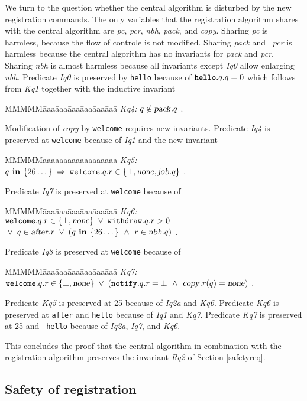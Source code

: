 \documentclass[10pt]{article} \usepackage[english]{babel}
\newenvironment{tab}{\begin{tabbing}
MMMMM\=aaa\=aaa\=aaa\=aaa\=aaa\=aaa\= \kill}{\end{tabbing}}
\def\S #1/{\mbox {\textsl{#1}}}
\def\B #1/{\mbox {\textbf{#1}}}
\def\T #1/{\mbox {\texttt{#1}}}
\def\Implies{\;\Rightarrow\;}
\def\Land   {\mbox{ $\;\land\;$ }}
\def\Lor    {\;\lor\;}
\begin{document}
We turn to the question whether the central algorithm is disturbed by
the new registration commands.  The only variables that the
registration algorithm shares with the central algorithm are \S pc/,
\S pcr/, \S nbh/, \S pack/, and \S copy/.  Sharing \S pc/ is harmless,
because the flow of controle is not modified.  Sharing \S pack/ and \S
pcr/ is harmless because the central algorithm has no invariants for
\S pack/ and \S pcr/.  Sharing \S nbh/ is almost harmless because all
invariants except \S Iq0/ allow enlarging \S nbh/.  Predicate \S Iq0/
is preserved by \T hello/ because of $\T hello/.q.q=0$ which follows
from \S Kq1/ together with the inductive invariant
\begin{tab}
  \S Kq4:/ \> $ q\notin \S pack/.q $ .
\end{tab}

Modification of \S copy/ by \T welcome/ requires new invariants.
Predicate \S Iq4/ is preserved at \T welcome/ because of \S Iq1/ and
the new invariant
\begin{tab}
\S Kq5:/ \> $ q\B\ in /\{26\dots\} \Implies 
\T welcome/.q.r \in \{ \bot, \S none/, \S job/.q \} $ .
\end{tab}
Predicate \S Iq7/ is preserved at \T welcome/ because of 
\begin{tab}
\S Kq6:/ \> $ \T welcome/.q.r \in \{ \bot, \S none/ \}
\Lor \T withdraw/.q.r > 0 $ \\
\> $ \Lor\: q\in\S after/.r
\Lor (q\B\ in /\{26\dots\} \Land r\in\S nbh/.q) $ .
\end{tab}
Predicate \S Iq8/ is preserved at \T welcome/ because of 
\begin{tab}
\S Kq7:/ \> $ \T welcome/.q.r \in \{ \bot, \S none/\}
\Lor (\T notify/.q.r = \bot \Land \S copy/.r(q) = \S none/) $ .
\end{tab}

Predicate \S Kq5/ is preserved at 25 because of \S Iq2a/ and \S Kq6/.
Predicate \S Kq6/ is preserved at \T after/ and \T hello/ because of
\S Iq1/ and \S Kq7/.  Predicate \S Kq7/ is preserved at 25 and \T
hello/ because of \S Iq2a/, \S Iq7/, and \S Kq6/.

This concludes the proof that the central algorithm in combination
with the registration algorithm preserves the invariant \S Rq2/ 
of Section \ref{safetyreq}. 

\subsection {Safety of registration} \label{queryverif}
\end{document}
